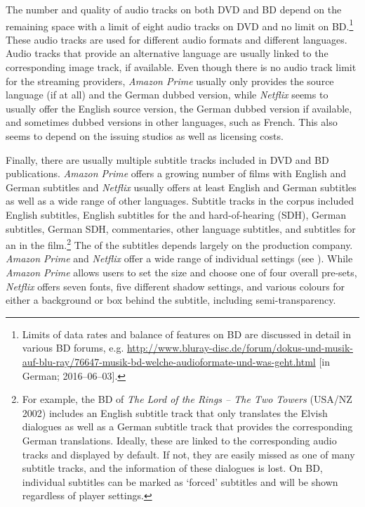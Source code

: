 The number and quality of audio tracks on both DVD and BD depend on the remaining space with a limit of eight audio tracks on DVD and no limit on BD.\footnote{Limits of data rates and balance of features on BD are discussed in detail in various BD forums, e.g. \url{http://www.bluray-disc.de/forum/dokus-und-musik-auf-blu-ray/76647-musik-bd-welche-audioformate-und-was-geht.html} [in German; 2016--06--03].} These audio tracks are used for different audio formats and different languages. Audio tracks that provide an alternative language are usually linked to the corresponding image track, if available. Even though there is no audio track limit for the streaming providers, \textit{Amazon Prime} usually only provides the source language (if at all) and the German dubbed version, while \textit{Netflix} seems to usually offer the English source version, the German dubbed version if available, and sometimes dubbed versions in other languages, such as French. This also seems to depend on the issuing studios as well as licensing costs.

Finally, there are usually multiple subtitle tracks included in DVD and BD publications. \textit{Amazon Prime} offers a growing number of films with English and German subtitles and \textit{Netflix} usually offers at least English and German subtitles as well as a wide range of other languages. Subtitle tracks in the corpus included English subtitles, English subtitles for the  and hard-of-hearing (SDH), German subtitles, German SDH, commentaries, other language subtitles, and subtitles for an  in the film.\footnote{For example, the BD of \textit{The Lord of the Rings – The Two Towers} (USA/NZ 2002) includes an English subtitle track that only translates the Elvish dialogues as well as a German subtitle track that provides the corresponding German translations. Ideally, these are linked to the corresponding audio tracks and displayed by default. If not, they are easily missed as one of many subtitle tracks, and the information of these dialogues is lost. On BD, individual subtitles can be marked as ‘forced’ subtitles and will be shown regardless of player settings.} The  of the subtitles depends largely on the production company. \textit{Amazon Prime} and \textit{Netflix} offer a wide range of individual  settings (see ). While \textit{Amazon Prime} allows users to set the size and choose one of four overall  pre-sets, \textit{Netflix} offers seven fonts, five different shadow settings, and various colours for either a background or box behind the subtitle, including semi-transparency.


